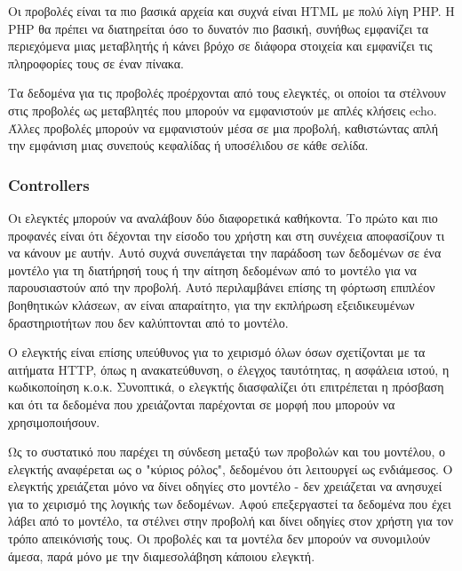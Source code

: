 Οι προβολές είναι τα πιο βασικά αρχεία και συχνά είναι HTML με πολύ λίγη PHP. Η PHP θα πρέπει να διατηρείται όσο το δυνατόν πιο βασική, συνήθως εμφανίζει τα περιεχόμενα μιας μεταβλητής ή κάνει βρόχο σε διάφορα στοιχεία και εμφανίζει τις πληροφορίες τους σε έναν πίνακα.

Τα δεδομένα για τις προβολές προέρχονται από τους ελεγκτές, οι οποίοι τα στέλνουν στις προβολές ως μεταβλητές που μπορούν να εμφανιστούν με απλές κλήσεις echo. Άλλες προβολές μπορούν να εμφανιστούν μέσα σε μια προβολή, καθιστώντας απλή την εμφάνιση μιας συνεπούς κεφαλίδας ή υποσέλιδου σε κάθε σελίδα.

\subsubsection{Controllers} \label{thb:Controllers}
Οι ελεγκτές μπορούν να αναλάβουν δύο διαφορετικά καθήκοντα. Το πρώτο και πιο προφανές είναι ότι δέχονται την είσοδο του χρήστη και στη συνέχεια αποφασίζουν τι να κάνουν με αυτήν. Αυτό συχνά συνεπάγεται την παράδοση των δεδομένων σε ένα μοντέλο για τη διατήρησή τους ή την αίτηση δεδομένων από το μοντέλο για να παρουσιαστούν από την προβολή. Αυτό περιλαμβάνει επίσης τη φόρτωση επιπλέον βοηθητικών κλάσεων, αν είναι απαραίτητο, για την εκπλήρωση εξειδικευμένων δραστηριοτήτων που δεν καλύπτονται από το μοντέλο.

Ο ελεγκτής είναι επίσης υπεύθυνος για το χειρισμό όλων όσων σχετίζονται με τα αιτήματα HTTP, όπως η ανακατεύθυνση, ο έλεγχος ταυτότητας, η ασφάλεια ιστού, η κωδικοποίηση κ.ο.κ. Συνοπτικά, ο ελεγκτής διασφαλίζει ότι επιτρέπεται η πρόσβαση και ότι τα δεδομένα που χρειάζονται παρέχονται σε μορφή που μπορούν να χρησιμοποιήσουν.

Ως το συστατικό που παρέχει τη σύνδεση μεταξύ των προβολών και του μοντέλου, ο ελεγκτής αναφέρεται ως ο "κύριος ρόλος", δεδομένου ότι λειτουργεί ως ενδιάμεσος. Ο ελεγκτής χρειάζεται μόνο να δίνει οδηγίες στο μοντέλο - δεν χρειάζεται να ανησυχεί για το χειρισμό της λογικής των δεδομένων. Αφού επεξεργαστεί τα δεδομένα που έχει λάβει από το μοντέλο, τα στέλνει στην προβολή και δίνει οδηγίες στον χρήστη για τον τρόπο απεικόνισής τους. Οι προβολές και τα μοντέλα δεν μπορούν να συνομιλούν άμεσα, παρά μόνο με την διαμεσολάβηση κάποιου ελεγκτή.

